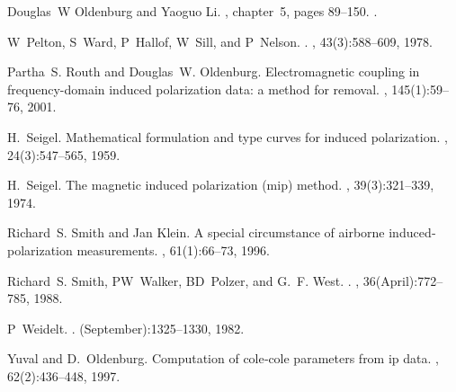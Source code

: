 \documentclass[extra,mreferee]{gji}
\begin{document}
\begin{thebibliography}{}
Douglas~W Oldenburg and Yaoguo Li.
, chapter~5,
  pages 89--150.
.

W~Pelton, S~Ward, P~Hallof, W~Sill, and P~Nelson.
.
, 43(3):588--609, 1978.

Partha~S. Routh and Douglas~W. Oldenburg.
\newblock Electromagnetic coupling in frequency-domain induced polarization
  data: a method for removal.
, 145(1):59--76, 2001.

H.~Seigel.
\newblock Mathematical formulation and type curves for induced polarization.
, 24(3):547--565, 1959.

H.~Seigel.
\newblock The magnetic induced polarization (mip) method.
, 39(3):321--339, 1974.

Richard~S. Smith and Jan Klein.
\newblock A special circumstance of airborne induced‐polarization
  measurements.
, 61(1):66--73, 1996.

Richard~S. Smith, PW~Walker, BD~Polzer, and G.~F. West.
.
, 36(April):772--785, 1988.

P~Weidelt.
.
(September):1325--1330, 1982.

Yuval and D.~Oldenburg.
\newblock Computation of cole‐cole parameters from ip data.
, 62(2):436--448, 1997.

\end{thebibliography}
\end{document}
